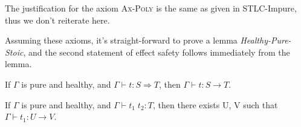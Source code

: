 The justification for the axiom \textsc{Ax-Poly} is the same as given
in STLC-Impure, thus we don't reiterate here.

Assuming these axioms, it's straight-forward to prove a lemma
\emph{Healthy-Pure-Stoic}, and the second statement of effect safety
follows immediately from the lemma.

\begin{lemma}
  If $\Gamma$ is pure and healthy,  and $\Gamma \vdash t : S
  \Rightarrow T$, then $\Gamma \vdash t : S \to T$.
\end{lemma}

\begin{theorem}
  If $\Gamma$ is pure and healthy, and $\Gamma \vdash t_1 \; t_2 : T$,
  then there exists U, V such that $\Gamma \vdash t_1 : U \to V$.
\end{theorem}

